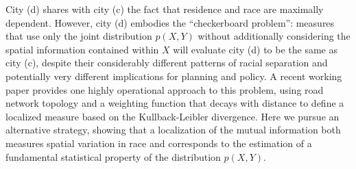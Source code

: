 \documentclass[english]{scrartcl}
\begin{document}
	City (d) shares with city (c) the fact that residence and race are maximally dependent. However, city (d) embodies the ``checkerboard problem'': measures that use only the joint distribution $p(X,Y)$ without additionally considering the spatial information contained within $X$ will evaluate city (d) to be the same as city (c), despite their considerably different patterns of racial separation and potentially very different implications for planning and policy. A recent working paper \cite{Roberto2015} provides one highly operational approach to this problem, using road network topology and a weighting function that decays with distance to define a localized measure based on the Kullback-Leibler divergence. Here we pursue an alternative strategy, showing that a localization of the mutual information both measures spatial variation in race and corresponds to the estimation of a fundamental statistical property of the distribution $p(X,Y)$. 






\end{document}
